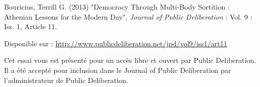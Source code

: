 \begin{titlepage}
\begin{recomd}
\begin{footnotesize}
          Bouricius, Terrill G. (2013) "Democracy Through Multi-Body
          Sortition : Athenian Lessons for the Modern Day",
          \emph{Journal of Public Deliberation} : Vol. 9 : Iss. 1,
          Article 11.\par 
        \noindent
        Disponible sur :
        \url{http://www.publicdeliberation.net/jpd/vol9/iss1/art11}\par
      \end{footnotesize}
      \noindent
      \begin{scriptsize}
        Cet essai vous est présenté pour un accès libre et ouvert par
        Public Deliberation. Il a été accepté pour inclusion dans le
        Journal of Public Deliberation par l'administrateur de Public
        Deliberation. 
      \end{scriptsize}
  \end{recomd}
\end{titlepage}






